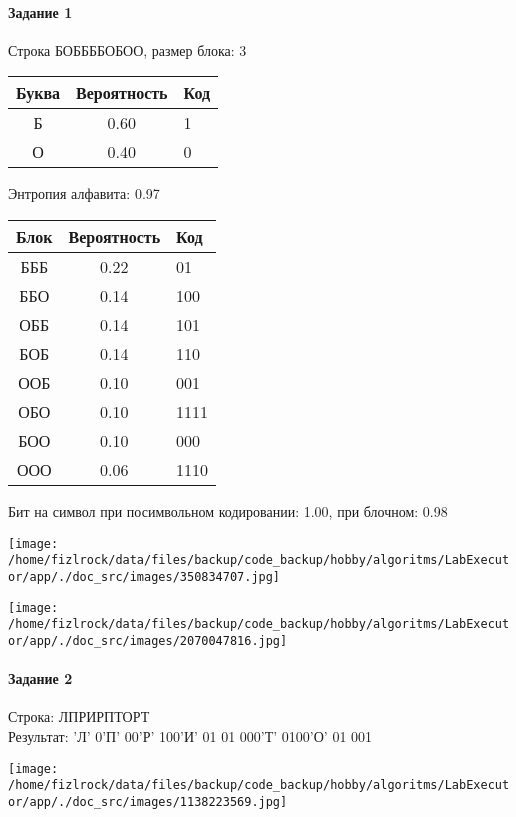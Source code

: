 \documentclass[a4paper, 12pt]{article}
\begin{document}
\paragraph{Задание 1}

Строка БОББББОБОО, размер блока: 3
\begin{center}
 \begin{tabular}{ |c|c|l| } 
  \hline
     Буква & Вероятность & Код\\ \hline
Б & 0.60 & 1\\\hline
О & 0.40 & 0
\\ \hline \end{tabular}
\end{center}
Энтропия алфавита: 0.97
\begin{center}
 \begin{tabular}{ |c|c|l| } 
  \hline
     Блок & Вероятность & Код\\ \hline
БББ & 0.22 & 01\\\hline
ББО & 0.14 & 100\\\hline
ОББ & 0.14 & 101\\\hline
БОБ & 0.14 & 110\\\hline
ООБ & 0.10 & 001\\\hline
ОБО & 0.10 & 1111\\\hline
БОО & 0.10 & 000\\\hline
ООО & 0.06 & 1110
\\ \hline \end{tabular}
\end{center}
Бит на символ при посимвольном кодировании: 1.00, при блочном: 0.98

\texttt{[image: /home/fizlrock/data/files/backup/code\_backup/hobby/algoritms/LabExecutor/app/./doc\_src/images/350834707.jpg]}

\texttt{[image: /home/fizlrock/data/files/backup/code\_backup/hobby/algoritms/LabExecutor/app/./doc\_src/images/2070047816.jpg]}
\pagebreak
\paragraph{Задание 2}

Строка: 
ЛПРИРПТОРТ\\
Результат: 'Л' 0'П' 00'Р' 100'И' 01 01 000'Т' 0100'О' 01 001

\texttt{[image: /home/fizlrock/data/files/backup/code\_backup/hobby/algoritms/LabExecutor/app/./doc\_src/images/1138223569.jpg]}
\end{document}

